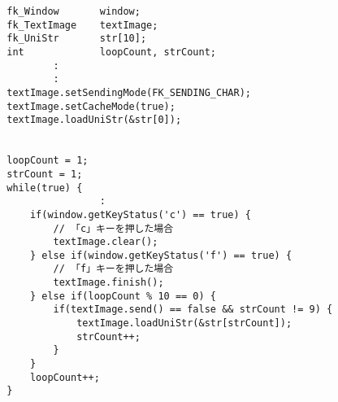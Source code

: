 \begin{breakbox}
\begin{verbatim}
        fk_Window       window;
        fk_TextImage    textImage;
        fk_UniStr       str[10];
        int             loopCount, strCount;
                :
                :
        textImage.setSendingMode(FK_SENDING_CHAR);
        textImage.setCacheMode(true);
        textImage.loadUniStr(&str[0]);


        loopCount = 1;
        strCount = 1;
        while(true) {
                        :
            if(window.getKeyStatus('c') == true) {
                // 「c」キーを押した場合
                textImage.clear();
            } else if(window.getKeyStatus('f') == true) {
                // 「f」キーを押した場合
                textImage.finish();
            } else if(loopCount % 10 == 0) {
                if(textImage.send() == false && strCount != 9) {
                    textImage.loadUniStr(&str[strCount]);
                    strCount++;
                }
            }
            loopCount++;
        }
\end{verbatim}
\end{breakbox}
